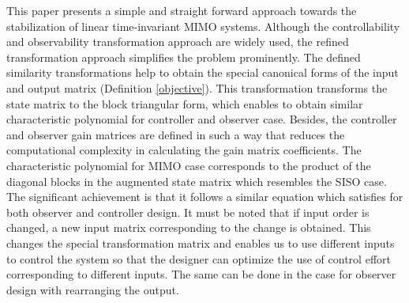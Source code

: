 \documentclass{elsarticle}
\numberwithin{equation}{section}
\begin{document}
This paper presents a simple and straight forward approach towards the stabilization of linear time-invariant MIMO systems. Although the controllability and observability transformation approach are widely used, the refined transformation approach simplifies the problem prominently. The defined similarity transformations help to obtain the special canonical forms of the input and output matrix (Definition \ref{objective}). This transformation transforms the state matrix to the block triangular form, which enables to obtain similar characteristic polynomial for controller and observer case. Besides, the controller and observer gain matrices are defined in such a way that reduces the computational complexity in calculating the gain matrix coefficients. The characteristic polynomial for MIMO case corresponds to the product of the diagonal blocks in the augmented state matrix which resembles the SISO case. The significant achievement is that it follows a similar equation which satisfies for both observer and controller design. It must be noted that if input order is changed, a new input matrix corresponding to the change is obtained. This changes the special transformation matrix and enables us to use different inputs to control the system so that the designer can optimize the use of control effort corresponding to different inputs. The same can be done in the case for observer design with rearranging the output.
    
 

\end{document}
